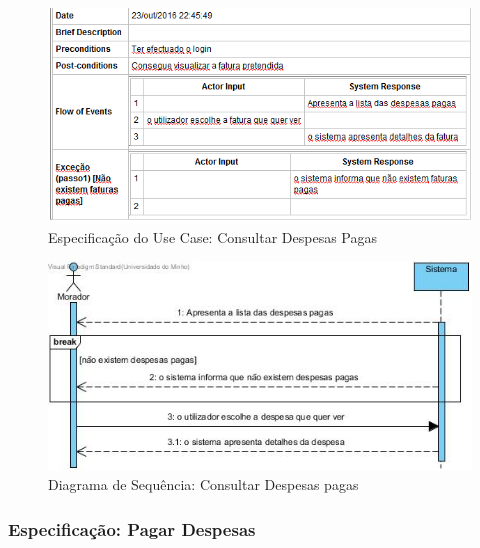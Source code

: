 \begin{figure}[htb!]
	\centering
	\includegraphics[scale=0.6]{imagens/Especificacoes/consultardespesaspagas}  
	\caption{Especificação do Use Case: Consultar Despesas Pagas}  
\end{figure}

\begin{figure}[htb!]
	\centering
	\includegraphics[scale=0.6]{imagens/DiagramaSeq/ConsultarDespesasPagas}  
	\caption{Diagrama de Sequência: Consultar Despesas pagas }  
\end{figure}


\newpage
\subsubsection{Especificação: Pagar Despesas }

